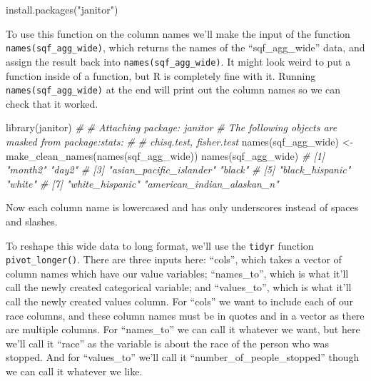 \documentclass[
  a4paper,
]{krantz}
\makeatletter
\newenvironment{Shaded}{\begin{snugshade}}{\end{snugshade}}
\newcommand{\CommentTok}[1]{\textcolor[rgb]{0.37,0.37,0.37}{\textit{#1}}}
\newcommand{\FunctionTok}[1]{\textcolor[rgb]{0,0,0}{#1}}
\newcommand{\NormalTok}[1]{#1}
\newcommand{\OtherTok}[1]{\textcolor[rgb]{0.37,0.37,0.37}{#1}}
\newcommand{\StringTok}[1]{\textcolor[rgb]{0.5,0.5,0.5}{#1}}
\newenvironment{kframe}{%
\medskip{}
\setlength{\fboxsep}{.8em}
 \def\at@end@of@kframe{}%
 \ifinner\ifhmode%
  \def\at@end@of@kframe{\end{minipage}}%
  \begin{minipage}{\columnwidth}%
 \fi\fi%
 \def\FrameCommand##1{\hskip\@totalleftmargin \hskip-\fboxsep
 \colorbox{shadecolor}{##1}\hskip-\fboxsep
     \hskip-\linewidth \hskip-\@totalleftmargin \hskip\columnwidth}%
 \MakeFramed {\advance\hsize-\width
   \@totalleftmargin\z@ \linewidth\hsize
   \@setminipage}}%
 {\par\unskip\endMakeFramed%
 \at@end@of@kframe}
\renewenvironment{Shaded}{\begin{kframe}}{\end{kframe}}
\makeatother
\begin{document}
\begin{Shaded}
\begin{Highlighting}[]
\FunctionTok{install.packages}\NormalTok{(}\StringTok{"janitor"}\NormalTok{)}
\end{Highlighting}
\end{Shaded}

To use this function on the column names we'll make the
input of the function \texttt{names(sqf\_agg\_wide)}, which
returns the names of the ``sqf\_agg\_wide'' data, and assign
the result back into \texttt{names(sqf\_agg\_wide)}. It
might look weird to put a function inside of a function, but
R is completely fine with it. Running
\texttt{names(sqf\_agg\_wide)} at the end will print out the
column names so we can check that it worked.

\begin{Shaded}
\begin{Highlighting}[]
\FunctionTok{library}\NormalTok{(janitor)}
\CommentTok{\# }
\CommentTok{\# Attaching package: \textquotesingle{}janitor\textquotesingle{}}
\CommentTok{\# The following objects are masked from \textquotesingle{}package:stats\textquotesingle{}:}
\CommentTok{\# }
\CommentTok{\#     chisq.test, fisher.test}
\FunctionTok{names}\NormalTok{(sqf\_agg\_wide) }\OtherTok{\textless{}{-}} \FunctionTok{make\_clean\_names}\NormalTok{(}\FunctionTok{names}\NormalTok{(sqf\_agg\_wide))}
\FunctionTok{names}\NormalTok{(sqf\_agg\_wide)}
\CommentTok{\# [1] "month2"                    "day2"                     }
\CommentTok{\# [3] "asian\_pacific\_islander"    "black"                    }
\CommentTok{\# [5] "black\_hispanic"            "white"                    }
\CommentTok{\# [7] "white\_hispanic"            "american\_indian\_alaskan\_n"}
\end{Highlighting}
\end{Shaded}

Now each column name is lowercased and has only underscores
instead of spaces and slashes.

To reshape this wide data to long format, we'll use the
\texttt{tidyr} function \texttt{pivot\_longer()}. There are
three inputs here: ``cols'', which takes a vector of column
names which have our value variables; ``names\_to'', which
is what it'll call the newly created categorical variable;
and ``values\_to'', which is what it'll call the newly
created values column. For ``cols'' we want to include each
of our race columns, and these column names must be in
quotes and in a vector as there are multiple columns. For
``names\_to'' we can call it whatever we want, but here
we'll call it ``race'' as the variable is about the race of
the person who was stopped. And for ``values\_to'' we'll
call it ``number\_of\_people\_stopped'' though we can call
it whatever we like.
\end{document}
